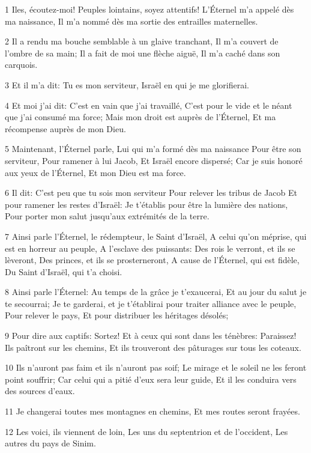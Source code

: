 \par 1 Iles, écoutez-moi! Peuples lointains, soyez attentifs! L'Éternel m'a appelé dès ma naissance, Il m'a nommé dès ma sortie des entrailles maternelles.
\par 2 Il a rendu ma bouche semblable à un glaive tranchant, Il m'a couvert de l'ombre de sa main; Il a fait de moi une flèche aiguë, Il m'a caché dans son carquois.
\par 3 Et il m'a dit: Tu es mon serviteur, Israël en qui je me glorifierai.
\par 4 Et moi j'ai dit: C'est en vain que j'ai travaillé, C'est pour le vide et le néant que j'ai consumé ma force; Mais mon droit est auprès de l'Éternel, Et ma récompense auprès de mon Dieu.
\par 5 Maintenant, l'Éternel parle, Lui qui m'a formé dès ma naissance Pour être son serviteur, Pour ramener à lui Jacob, Et Israël encore dispersé; Car je suis honoré aux yeux de l'Éternel, Et mon Dieu est ma force.
\par 6 Il dit: C'est peu que tu sois mon serviteur Pour relever les tribus de Jacob Et pour ramener les restes d'Israël: Je t'établis pour être la lumière des nations, Pour porter mon salut jusqu'aux extrémités de la terre.
\par 7 Ainsi parle l'Éternel, le rédempteur, le Saint d'Israël, A celui qu'on méprise, qui est en horreur au peuple, A l'esclave des puissants: Des rois le verront, et ils se lèveront, Des princes, et ils se prosterneront, A cause de l'Éternel, qui est fidèle, Du Saint d'Israël, qui t'a choisi.
\par 8 Ainsi parle l'Éternel: Au temps de la grâce je t'exaucerai, Et au jour du salut je te secourrai; Je te garderai, et je t'établirai pour traiter alliance avec le peuple, Pour relever le pays, Et pour distribuer les héritages désolés;
\par 9 Pour dire aux captifs: Sortez! Et à ceux qui sont dans les ténèbres: Paraissez! Ils paîtront sur les chemins, Et ils trouveront des pâturages sur tous les coteaux.
\par 10 Ils n'auront pas faim et ils n'auront pas soif; Le mirage et le soleil ne les feront point souffrir; Car celui qui a pitié d'eux sera leur guide, Et il les conduira vers des sources d'eaux.
\par 11 Je changerai toutes mes montagnes en chemins, Et mes routes seront frayées.
\par 12 Les voici, ils viennent de loin, Les uns du septentrion et de l'occident, Les autres du pays de Sinim.
